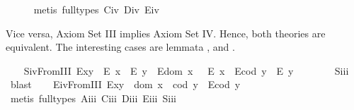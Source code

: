 \begin{isabellebody}
%
\isadelimproof
\ \ \ \ %
\endisadelimproof
%
\isatagproof
{}\isamarkupfalse%
\ {\isacharparenleft}metis\ {\isacharparenleft}full{\isacharunderscore}types{\isacharparenright}\ C\isactrlsub i\isactrlsub v\ D\isactrlsub i\isactrlsub v\ E\isactrlsub i\isactrlsub v{\isacharparenright}%
\endisatagproof
{\isafoldproof}%
%
\isadelimproof
%
\endisadelimproof
%
\begin{isamarkuptext}%
Vice versa, Axiom Set III implies Axiom Set IV. Hence, both theories are
 equivalent. The interesting cases are lemmata , 
 and .%
\end{isamarkuptext}\isamarkuptrue%
\isanewline
\ \ \isamarkupfalse%
\ S\isactrlsub i\isactrlsub vFromIII{\isacharcolon}\ {\isachardoublequoteopen}{\isacharparenleft}E{\isacharparenleft}x{\isasymcdot}y{\isacharparenright}\ \isactrlbold {\isasymrightarrow}\ {\isacharparenleft}E\ x\ \isactrlbold {\isasymand}\ E\ y{\isacharparenright}{\isacharparenright}\ \isactrlbold {\isasymand}\ {\isacharparenleft}E{\isacharparenleft}dom\ x\ {\isacharparenright}\ \isactrlbold {\isasymrightarrow}\ E\ x{\isacharparenright}\ \isactrlbold {\isasymand}\ {\isacharparenleft}E{\isacharparenleft}cod\ y{\isacharparenright}\ \isactrlbold {\isasymrightarrow}\ E\ y{\isacharparenright}{\isachardoublequoteclose}\ \ \isanewline
%
\isadelimproof
\ \ \ \ %
\endisadelimproof
%
\isatagproof
{}\isamarkupfalse%
\ S\isactrlsub i\isactrlsub i\isactrlsub i\ \isamarkupfalse%
\ blast%
\endisatagproof
{\isafoldproof}%
%
\isadelimproof
\isanewline
%
\endisadelimproof
\ \ \isamarkupfalse%
\ E\isactrlsub i\isactrlsub vFromIII{\isacharcolon}\ {\isachardoublequoteopen}E{\isacharparenleft}x{\isasymcdot}y{\isacharparenright}\ \isactrlbold {\isasymleftrightarrow}\ {\isacharparenleft}dom\ x\ {\isasymcong}\ cod\ y\ \isactrlbold {\isasymand}\ E{\isacharparenleft}cod\ y{\isacharparenright}{\isacharparenright}{\isachardoublequoteclose}\ \isanewline
%
\isadelimproof
\ \ \ \ %
\endisadelimproof
%
\isatagproof
{}\isamarkupfalse%
\ {\isacharparenleft}metis\ {\isacharparenleft}full{\isacharunderscore}types{\isacharparenright}\ A\isactrlsub i\isactrlsub i\isactrlsub i\ C\isactrlsub i\isactrlsub i\isactrlsub i\ D\isactrlsub i\isactrlsub i\isactrlsub i\ E\isactrlsub i\isactrlsub i\isactrlsub i\ S\isactrlsub i\isactrlsub i\isactrlsub i{\isacharparenright}%
\endisatagproof
{\isafoldproof}%
%
\isadelimproof
\isanewline
%
\endisadelimproof

\end{isabellebody}
